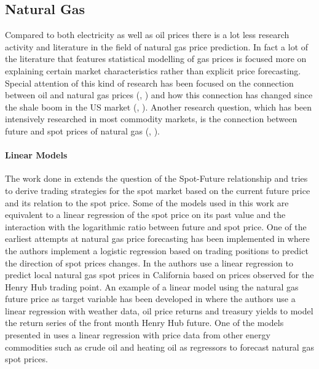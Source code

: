 \subsection{Natural Gas}
Compared to both electricity as well as oil prices there is a lot less research activity and literature in the field of natural gas price prediction. In fact a lot of the literature that features statistical modelling of gas prices is focused more on explaining certain market characteristics rather than explicit price forecasting. Special attention of this kind of research has been focused on the connection between oil and natural gas prices (\cite{villar_relationship_2006}, \cite{hartley_relationship_2008}) and how this connection has changed since the shale boom in the US market (\cite{geng_how_2016}, \cite{caporin_long-run_2017}). Another research question, which has been intensively researched in most commodity markets, is the connection between future and spot prices of natural gas (\cite{herbert_relation_1993}, \cite{chinn_predictive_2014}).

\paragraph{Linear Models}
The work done in\cite{mishra_are_2016} extends the question of the Spot-Future relationship and tries to derive trading strategies for the spot market based on the current future price and its relation to the spot price. Some of the models used in this work are equivalent to a linear regression of the spot price on its past value and the interaction with the logarithmic ratio between future and spot price. One of the earliest attempts at natural gas price forecasting has been implemented in 
\cite{buchanan_which_2001} where the authors implement a logistic regression based on trading positions to predict the direction of spot prices changes.
In \cite{woo_market_2006} the authors use a linear regression to predict local natural gas spot prices in California based on prices observed for the Henry Hub trading point. An example of a linear model using the natural gas future price as target variable has been developed in \cite{mu_weather_2007} where the authors use a linear regression with weather data, oil price returns and treasury yields to model the return series of the front month Henry Hub future. One of the models presented in \cite{malliaris_forecasting_2008} uses a linear regression with price data from other energy commodities such as crude oil and heating oil as regressors to forecast natural gas spot prices. 


